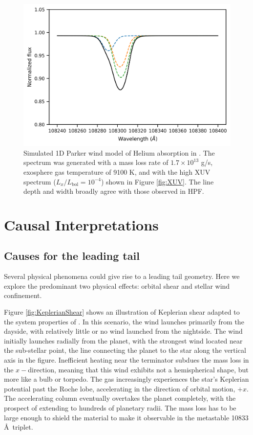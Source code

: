 \documentclass[twocolumn]{aastex631}
\newcommand{\hatpb}{\object{HAT-P-67 b}}
\begin{document}
\begin{figure}
    \includegraphics[width=\linewidth]{figures/pwinds_1D_higXUV_t1p2Gyr.png}
    \caption{Simulated 1D Parker wind model of Helium absorption in \hatpb.  The spectrum was generated with a mass loss rate of $1.7\times10^{13}$ g/s, exosphere gas temperature of 9100 K, and with the high XUV spectrum ($L_x/L_\mathrm{bol}=10^{-4}$) shown in Figure \ref{fig:XUV}.  The line depth and width broadly agree with those observed in HPF.}
    \label{fig:pwinds}
\end{figure}


\section{Causal Interpretations} \label{secDiscuss}

\subsection{Causes for the leading tail} \label{secLeading}
Several physical phenomena could give rise to a leading tail geometry.  Here we explore the predominant two physical effects: orbital shear and stellar wind confinement.

Figure \ref{fig:KeplerianShear} shows an illustration of Keplerian shear adapted to the system properties of \hatpb.  In this scenario, the wind launches primarily from the dayside, with relatively little or no wind launched from the nightside.  The wind initially launches radially from the planet, with the strongest wind located near the sub-stellar point, the line connecting the planet to the star along the vertical axis in the figure.  Inefficient heating near the terminator subdues the mass loss in the $x-$direction, meaning that this wind exhibits not a hemispherical shape, but more like a bulb or torpedo.  The gas increasingly experiences the star's Keplerian potential past the Roche lobe, accelerating in the direction of orbital motion, $+x$.  The accelerating column eventually overtakes the planet completely, with the prospect of extending to hundreds of planetary radii.  The mass loss has to be large enough to shield the material to make it observable in the metastable  10833 \AA~triplet.
\end{document}
